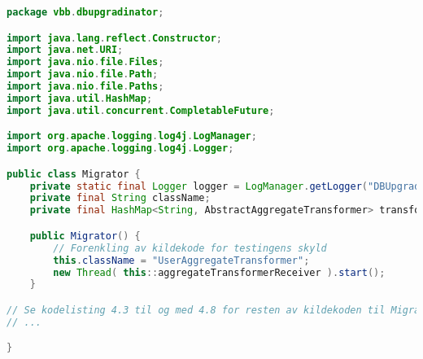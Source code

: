 \begin{lstlisting}[language=Java, caption={Migrator-klassen i DBUpgradinator}]
package vbb.dbupgradinator;

import java.lang.reflect.Constructor;
import java.net.URI;
import java.nio.file.Files;
import java.nio.file.Path;
import java.nio.file.Paths;
import java.util.HashMap;
import java.util.concurrent.CompletableFuture;

import org.apache.logging.log4j.LogManager;
import org.apache.logging.log4j.Logger;

public class Migrator {
    private static final Logger logger = LogManager.getLogger("DBUpgradinator");
    private final String className;
    private final HashMap<String, AbstractAggregateTransformer> transformers = new HashMap<>(4, (float) 0.95);

    public Migrator() {
        // Forenkling av kildekode for testingens skyld
        this.className = "UserAggregateTransformer";
        new Thread( this::aggregateTransformerReceiver ).start();
    }

// Se kodelisting 4.3 til og med 4.8 for resten av kildekoden til Migrator
// ...

}
\end{lstlisting}

